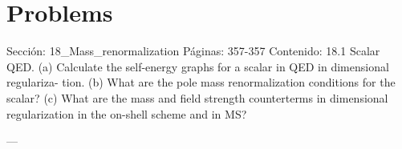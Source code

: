 \section*{Problems}
Sección: 18_Mass_renormalization
Páginas: 357-357
Contenido:
18.1 Scalar QED.
(a) Calculate the self-energy graphs for a scalar in QED in dimensional regulariza-
tion.
(b) What are the pole mass renormalization conditions for the scalar?
(c) What are the mass and ﬁeld strength counterterms in dimensional regularization
in the on-shell scheme and in MS?


---


